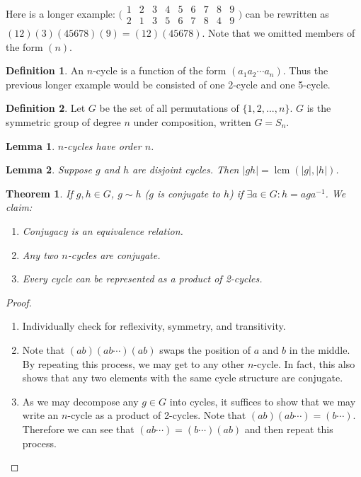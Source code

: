 \documentclass{article}
\theoremstyle{definition}
\newtheorem{definition}{Definition}
\theoremstyle{plain}
\newtheorem{theorem}{Theorem}
\theoremstyle{corollary}
\theoremstyle{lemma}
\newtheorem{lemma}{Lemma}
\DeclareMathOperator{\lcm}{lcm}
\begin{document}
Here is a longer example: $\bigl(\begin{smallmatrix}
  1 & 2 & 3 & 4 & 5 & 6 & 7 & 8 & 9\\
  2 & 1 & 3 & 5 & 6 & 7 & 8 & 4 & 9
\end{smallmatrix}\bigr)$ can be rewritten as $(12)(3)(45678)(9)=(12)(45678)$. Note that we omitted members of the form $(n)$.

\begin{definition}
An $n$-cycle is a function of the form $(a_1a_2\cdots a_n)$. Thus the previous longer example would be consisted of one 2-cycle and one 5-cycle.
\end{definition}

\begin{definition}
Let $G$ be the set of all permutations of $\{1,2,...,n\}$. $G$ is the symmetric group of degree $n$ under composition, written $G=S_n$.
\end{definition}

\begin{lemma}
$n$-cycles have order $n$.
\end{lemma}

\begin{lemma}
Suppose $g$ and $h$ are disjoint cycles. Then $|gh|=\lcm(|g|,|h|)$.
\end{lemma}

\begin{theorem}
    If $g,h\in G$, $g\sim h$ ($g$ is conjugate to $h$) if $\exists a\in G:h=aga^{-1}$. We claim:
    \begin{enumerate}
        \item Conjugacy is an equivalence relation.
        \item Any two $n$-cycles are conjugate.
        \item Every cycle can be represented as a product of 2-cycles.
    \end{enumerate}
\end{theorem}

\begin{proof}
    \begin{enumerate}
        \item Individually check for reflexivity, symmetry, and transitivity.
        \item Note that $(ab)(ab\cdots)(ab)$ swaps the position of $a$ and $b$ in the middle. By repeating this process, we may get to any other $n$-cycle. In fact, this also shows that any two elements with the same cycle structure are conjugate.
        \item As we may decompose any $g\in G$ into cycles, it suffices to show that we may write an $n$-cycle as a product of 2-cycles. Note that $(ab)(ab\cdots)=(b\cdots)$. Therefore we can see that $(ab\cdots)=(b\cdots)(ab)$ and then repeat this process.
    \end{enumerate}
\end{proof}
\end{document}
